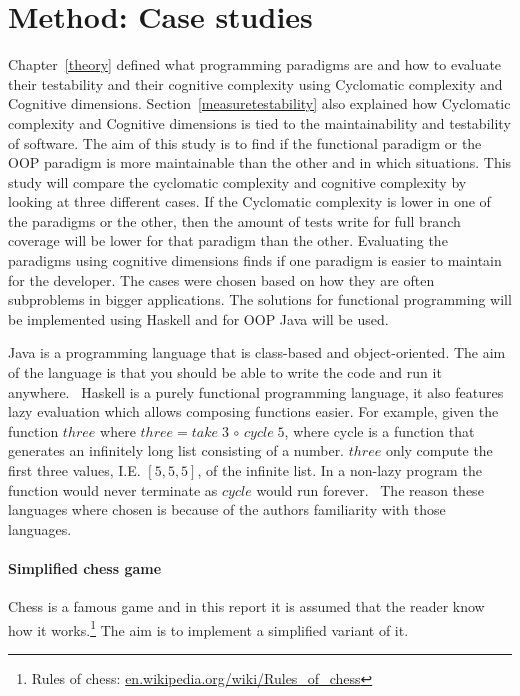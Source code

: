 \chapter{Method: Case studies}

Chapter~\ref{theory} defined what programming paradigms are and how to evaluate
their testability and their cognitive complexity using Cyclomatic complexity and
Cognitive dimensions. Section~\ref{measuretestability} also explained how
Cyclomatic complexity and Cognitive dimensions is tied to the maintainability
and testability of software. The aim of this study is to find if the functional
paradigm or the OOP paradigm is more maintainable than the other and in which
situations. This study will compare the cyclomatic complexity and cognitive
complexity by looking at three different cases. If the Cyclomatic complexity is
lower in one of the paradigms or the other, then the amount of tests write for
full branch coverage will be lower for that paradigm than the other.
Evaluating the paradigms using cognitive dimensions finds if one paradigm
is easier to maintain for the developer.  The cases were chosen based on how
they are often subproblems in bigger applications. The solutions for functional
programming will be implemented using Haskell and for OOP Java will be used. 

Java is a programming language that is class-based and object-oriented. The aim
of the language is that you should be able to write the code and run it
anywhere.~\cite{java} Haskell is a purely functional programming language, it
also features lazy evaluation which allows composing functions easier. For
example, given the function $three$ where $three = take\; 3 \, \circ \, cycle\;
5$, where cycle is a function that generates an infinitely long list consisting
of a number. $three$ only compute the first three values, I.E. $[5,5,5]$, of the
infinite list.  In a non-lazy program the function would never terminate as
$cycle$ would run forever.~\cite{haskell} The reason these languages where
chosen is because of the authors familiarity with those languages.

\subsubsection*{Simplified chess game}

Chess is a famous game and in this report it is assumed that the reader know how
it works.\footnote{Rules of chess: \url{en.wikipedia.org/wiki/Rules_of_chess}}
The aim is to implement a simplified variant of it. 

